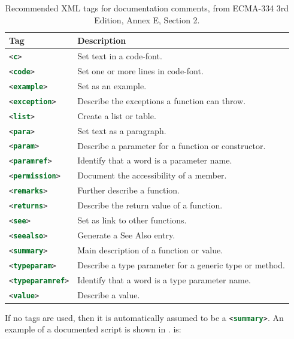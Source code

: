 \documentclass[springer.tex]{subfiles}
\begin{document}
\begin{table}
  \centering
  \begin{tabularx}{\linewidth}{|l|X|}
       \hline
    \rowcolor{headerRowColor} Tag & Description\\
    \hline
    \lstinline[language=xml]!<c>! &Set text in a code-font.\\
    \hline
    \lstinline[language=xml]!<code>! &Set one or more lines in code-font.\\
    \hline
    \lstinline[language=xml]!<example>! &Set as an example.\\
    \hline
    \lstinline[language=xml]!<exception>! &Describe the exceptions a function can throw.\\
    \hline
    \lstinline[language=xml]!<list>! &Create a list or table.\\
    \hline
    \lstinline[language=xml]!<para>! &Set text as a paragraph.\\
    \hline
    \lstinline[language=xml]!<param>! &Describe a parameter for a function or constructor.\\
    \hline
    \lstinline[language=xml]!<paramref>! &Identify that a word is a parameter name.\\
    \hline
    \lstinline[language=xml]!<permission>! &Document the accessibility of a member.\\
    \hline
    \lstinline[language=xml]!<remarks>! &Further describe a function.\\
    \hline
    \lstinline[language=xml]!<returns>! &Describe the return value of a function.\\
    \hline
    \lstinline[language=xml]!<see>! &Set as link to other functions.\\
    \hline
    \lstinline[language=xml]!<seealso>! &Generate a See Also entry.\\
    \hline
    \lstinline[language=xml]!<summary>! &Main description of a function or value.\\
    \hline
    \lstinline[language=xml]!<typeparam>! &Describe a type parameter for a generic type or method.\\
    \hline
    \lstinline[language=xml]!<typeparamref>! &Identify that a word is a type parameter name.\\
    \hline
    \lstinline[language=xml]!<value>! &Describe a value.\\
    \hline
  \end{tabularx}
  \caption{Recommended XML tags for documentation comments, from ECMA-334 3rd Edition, Annex E, Section 2.}
  \label{tab:xmlTags}
\end{table}
If no tags are used, then it is automatically assumed to be a \lstinline[language=xml]!<summary>!. An example of a documented script is shown in .
is:
%
%
\end{document}
